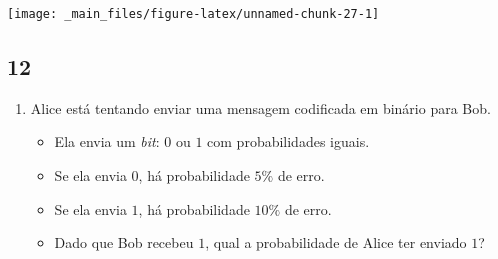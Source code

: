 \documentclass[
  11pt]{report}
\begin{document}
\begin{center}\texttt{[image: \_main\_files/figure-latex/unnamed-chunk-27-1]} \end{center}

\hypertarget{section-10}{%
\subsection*{12}\label{section-10}}

\begin{rmdbox}

\begin{enumerate}
\def\labelenumi{\alph{enumi}.}
\item
  Alice está tentando enviar uma mensagem codificada em binário para Bob.

  \begin{itemize}
  \item
    Ela envia um \emph{bit}: $0$ ou $1$ com probabilidades iguais.
  \item
    Se ela envia $0$, há probabilidade $5\%$ de erro.
  \item
    Se ela envia $1$, há probabilidade $10\%$ de erro.
  \item
    Dado que Bob recebeu $1$, qual a probabilidade de Alice ter enviado $1$?
  \end{itemize}
\end{enumerate}

\end{rmdbox}
\end{document}
